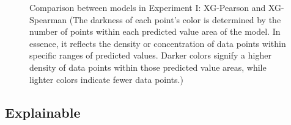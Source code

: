 \documentclass[12pt,a4paper,english
]{tunithesis}
\begin{document}
\begin{figure}
\begin{center}
    \qquad                        
      
    \caption[Results comparison in Experiment I]{Comparison between models in Experiment I: XG-Pearson and XG-Spearman (The darkness of each point's color is determined by the number of points within each predicted value area of the model. In essence, it reflects the density or concentration of data points within specific ranges of predicted values. Darker colors signify a higher density of data points within those predicted value areas, while lighter colors indicate fewer data points.)}    
    \label{fig:experiment_1_result}
  \end{center}
\end{figure}


\subsection{Explainable}
\end{document}
